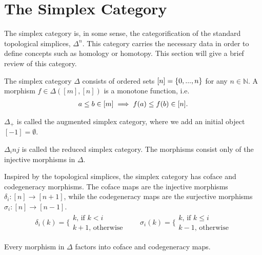 \documentclass[../thesis.tex]{subfiles}
\begin{document}
    \section{The Simplex Category}
        The simplex category is, in some sense, the categorification of the standard topological simplices, $\Delta^n$. This category carries the necessary data in order to define concepts such as homology or homotopy. This section will give a brief review of this category.

        \begin{definition}
            The simplex category $\Delta$ consists of ordered sets $[n] = \startset{0,...,n}$ for any $n\in\mathbb{N}$. A morphism $f\in\Delta([m],[n])$ is a monotone function, i.e.
            \begin{align*}
              a\leq b \in [m] \implies f(a) \leq f(b) \in [n]\tt{.}  
            \end{align*}
        \end{definition}

        \begin{definition}
            $\Delta_+$ is called the augmented simplex category, where we add an initial object $[-1] = \emptyset$.
        \end{definition}

        \begin{definition}
            $\Delta_inj$ is called the reduced simplex category. The morphisms consist only of the injective morphisms in $\Delta$.
        \end{definition}

        Inspired by the topological simplices, the simplex category has coface and codegeneracy morphisms. The coface maps are the injective morphisms $\delta_i : [n] \rightarrow [n+1]$, while the codegeneracy maps are the surjective morphisms $\sigma_i: [n] \rightarrow [n-1]$.
        \begin{align*}
            \delta_i(k) = \biggl\{\substack{k\text{, if }k<i \\ k+1\text{, otherwise}} \qquad
            \sigma_i(k) = \biggl\{\substack{k\text{, if }k\leq i \\ k-1\text{, otherwise}}
        \end{align*}

        \begin{proposition}
            Every morphism in $\Delta$ factors into coface and codegeneracy maps.
        \end{proposition}
\end{document}
